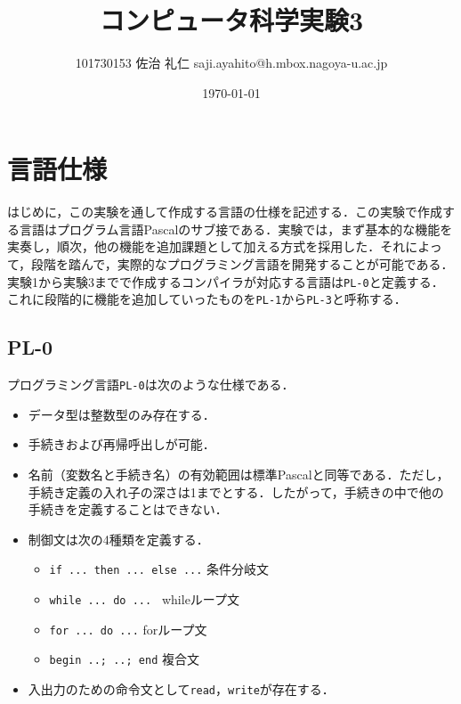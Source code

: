\documentclass[uplatex]{jsarticle}
\title{コンピュータ科学実験3}
\author{101730153 佐治 礼仁 saji.ayahito@h.mbox.nagoya-u.ac.jp}
\date{\today}
\begin{document}
\maketitle
\newpage
\tableofcontents
\newpage
\section{言語仕様}
はじめに，この実験を通して作成する言語の仕様を記述する．この実験で作成する言語はプログラム言語Pascalのサブ接である．実験では，まず基本的な機能を実奏し，順次，他の機能を追加課題として加える方式を採用した．それによって，段階を踏んで，実際的なプログラミング言語を開発することが可能である．
実験1から実験3までで作成するコンパイラが対応する言語は\verb#PL-0#と定義する．これに段階的に機能を追加していったものを\verb#PL-1#から\verb#PL-3#と呼称する．
\subsection{PL-0}
プログラミング言語\verb#PL-0#は次のような仕様である．
\begin{itemize}
  \item データ型は整数型のみ存在する．
  \item 手続きおよび再帰呼出しが可能．
  \item 名前（変数名と手続き名）の有効範囲は標準Pascalと同等である．ただし，手続き定義の入れ子の深さは1までとする．したがって，手続きの中で他の手続きを定義することはできない．
  \item 制御文は次の4種類を定義する．
  \begin{itemize}
    \item \verb#if ... then ... else ...# 条件分岐文
    \item \verb#while ... do ... # whileループ文
    \item \verb#for ... do ...# forループ文
    \item \verb#begin ..; ..; end# 複合文
  \end{itemize}
  \item 入出力のための命令文として\verb#read#，\verb#write#が存在する．
\end{itemize}
\end{document}
